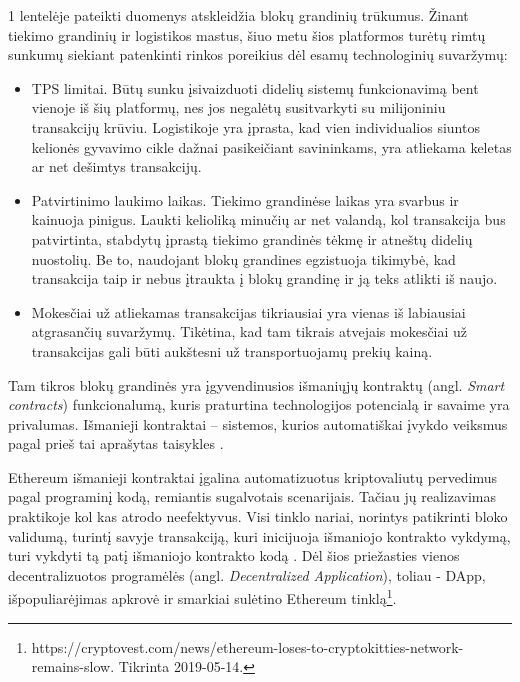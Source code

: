 1 lentelėje pateikti duomenys atskleidžia blokų grandinių trūkumus. Žinant tiekimo grandinių ir logistikos mastus, šiuo metu šios platformos turėtų rimtų sunkumų siekiant patenkinti rinkos poreikius dėl esamų technologinių suvaržymų: 
\begin{itemize}
    \item TPS limitai. Būtų sunku įsivaizduoti didelių sistemų funkcionavimą bent vienoje iš šių platformų, nes jos negalėtų susitvarkyti su milijoniniu transakcijų krūviu. Logistikoje yra įprasta, kad vien individualios siuntos kelionės gyvavimo cikle dažnai pasikeičiant savininkams, yra atliekama keletas ar net dešimtys transakcijų.
    \item Patvirtinimo laukimo laikas. Tiekimo grandinėse laikas yra svarbus ir kainuoja pinigus. Laukti kelioliką minučių ar net valandą, kol transakcija bus patvirtinta, stabdytų įprastą tiekimo grandinės tėkmę ir atneštų didelių nuostolių. Be to, naudojant blokų grandines egzistuoja tikimybė, kad transakcija taip ir nebus įtraukta į blokų grandinę ir ją teks atlikti iš naujo.
    \item Mokesčiai už atliekamas transakcijas tikriausiai yra vienas iš labiausiai atgrasančių suvaržymų. Tikėtina, kad tam tikrais atvejais mokesčiai už transakcijas gali būti aukštesni už transportuojamų prekių kainą.
\end{itemize} 

Tam tikros blokų grandinės yra įgyvendinusios išmaniųjų kontraktų (angl. \textit{Smart contracts}) funkcionalumą, kuris praturtina technologijos potencialą ir savaime yra privalumas. Išmanieji kontraktai – sistemos, kurios automatiškai įvykdo veiksmus pagal prieš tai aprašytas taisykles \cite{buterin2013ethereum}.

Ethereum išmanieji kontraktai įgalina automatizuotus kriptovaliutų pervedimus pagal programinį kodą, remiantis sugalvotais scenarijais. Tačiau jų realizavimas praktikoje kol kas atrodo neefektyvus. Visi tinklo nariai, norintys patikrinti bloko validumą, turintį savyje transakciją, kuri inicijuoja išmaniojo kontrakto vykdymą, turi vykdyti tą patį išmaniojo kontrakto kodą \cite{buterin2013ethereum}. Dėl šios priežasties vienos decentralizuotos programėlės (angl. \textit{Decentralized Application}), toliau - DApp, išpopuliarėjimas apkrovė ir smarkiai sulėtino Ethereum tinklą\footnote{https://cryptovest.com/news/ethereum-loses-to-cryptokitties-network-remains-slow. Tikrinta 2019-05-14.}.\pagebreak





